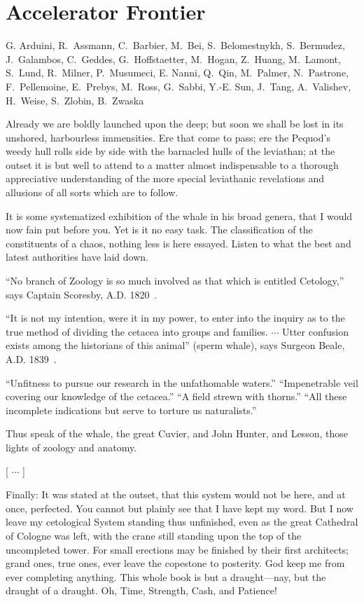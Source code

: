 
\setcounter{chapter}{6} 

\chapter{Accelerator Frontier}

   {G. Arduini, R.~Assmann, C.~Barbier, M.~Bei, S.~Belomestnykh, S.~Bermudez,  J.~Galambos, C.~Geddes,  G.~Hoffstaetter, 
M.~Hogan,  Z.~Huang,
M.~Lamont,  S.~Lund, R.~Milner, P.~Musumeci, E. Nanni, Q.~Qin, 
 M.~Palmer, N.~Pastrone,  F.~Pellemoine, E.~Prebys,
M.~Ross, G.~Sabbi, Y.-E. Sun,  J.~Tang, A.~Valishev, H.~Weise,  S.~Zlobin,  B.~Zwaska}


Already we are boldly launched upon the deep; but soon we shall be lost in its unshored, harbourless immensities. Ere that come to pass; ere the Pequod’s weedy hull rolls side by side with the barnacled hulls of the leviathan; at the outset it is but well to attend to a matter almost indispensable to a thorough appreciative understanding of the more special leviathanic revelations and allusions of all sorts which are to follow.

It is some systematized exhibition of the whale in his broad genera, that I would now fain put before you. Yet is it no easy task. The classification of the constituents of a chaos, nothing less is here essayed. Listen to what the best and latest authorities have laid down.

``No branch of Zoology is so much involved as that which is entitled Cetology,'' says Captain Scoresby, A.D. 1820~\cite{A-Scoresby}.

``It is not my intention, were it in my power, to enter into the inquiry as to the true method of dividing the cetacea into groups and families. $\cdots$ Utter confusion exists among the historians of this animal'' (sperm whale), says Surgeon Beale, A.D. 1839~\cite{A-Beale}.

``Unfitness to pursue our research in the unfathomable waters.'' ``Impenetrable veil covering our knowledge of the cetacea.''  ``A field strewn with thorns.'' ``All these incomplete indications but serve to torture us naturalists.''

Thus speak of the whale, the great Cuvier, and John Hunter, and Lesson, those lights of zoology and anatomy.

[ $\cdots$ ]

Finally: It was stated at the outset, that this system would not be here, and at once, perfected. You cannot but plainly see that I have kept my word. But I now leave my cetological System standing thus unfinished, even as the great Cathedral of Cologne was left, with the crane still standing upon the top of the uncompleted tower. For small erections may be finished by their first architects; grand ones, true ones, ever leave the copestone to posterity. God keep me from ever completing anything. This whole book is but a draught---nay, but the draught of a draught. Oh, Time, Strength, Cash, and Patience!


